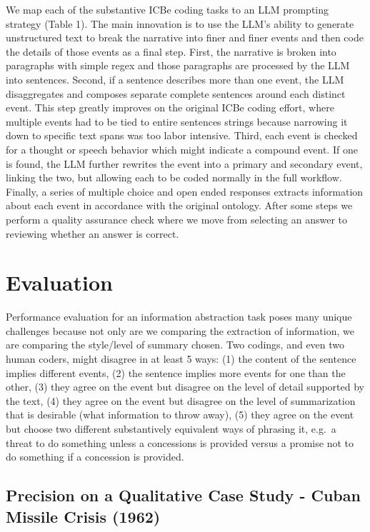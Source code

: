 \documentclass[
]{article}
\begin{document}
We map each of the substantive ICBe coding tasks to an LLM prompting
strategy (Table 1). The main innovation is to use the LLM's ability to
generate unstructured text to break the narrative into finer and finer
events and then code the details of those events as a final step. First,
the narrative is broken into paragraphs with simple regex and those
paragraphs are processed by the LLM into sentences. Second, if a
sentence describes more than one event, the LLM disaggregates and
composes separate complete sentences around each distinct event. This
step greatly improves on the original ICBe coding effort, where multiple
events had to be tied to entire sentences strings because narrowing it
down to specific text spans was too labor intensive. Third, each event
is checked for a thought or speech behavior which might indicate a
compound event. If one is found, the LLM further rewrites the event into
a primary and secondary event, linking the two, but allowing each to be
coded normally in the full workflow. Finally, a series of multiple
choice and open ended responses extracts information about each event in
accordance with the original ontology. After some steps we perform a
quality assurance check where we move from selecting an answer to
reviewing whether an answer is correct.

\section{Evaluation}\label{evaluation}

Performance evaluation for an information abstraction task poses many
unique challenges because not only are we comparing the extraction of
information, we are comparing the style/level of summary chosen. Two
codings, and even two human coders, might disagree in at least 5 ways:
(1) the content of the sentence implies different events, (2) the
sentence implies more events for one than the other, (3) they agree on
the event but disagree on the level of detail supported by the text, (4)
they agree on the event but disagree on the level of summarization that
is desirable (what information to throw away), (5) they agree on the
event but choose two different substantively equivalent ways of phrasing
it, e.g.~a threat to do something unless a concessions is provided
versus a promise not to do something if a concession is provided.

\subsection{Precision on a Qualitative Case Study - Cuban Missile Crisis
(1962)}\label{precision-on-a-qualitative-case-study---cuban-missile-crisis-1962}
\end{document}
